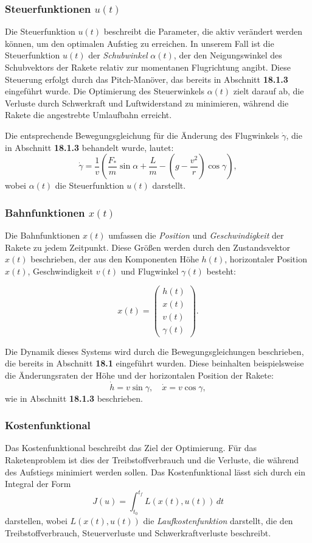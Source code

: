 \subsubsection{Steuerfunktionen \( u(t) \)}
Die Steuerfunktion \( u(t) \) beschreibt die Parameter, die aktiv verändert werden können, um den optimalen Aufstieg zu erreichen. In unserem Fall ist die Steuerfunktion \( u(t) \) der \textit{Schubwinkel} \( \alpha(t) \), der den Neigungswinkel des Schubvektors der Rakete relativ zur momentanen Flugrichtung angibt. Diese Steuerung erfolgt durch das Pitch-Manöver, das bereits in Abschnitt \textbf{18.1.3} eingeführt wurde. Die Optimierung des Steuerwinkels \( \alpha(t) \) zielt darauf ab, die Verluste durch Schwerkraft und Luftwiderstand zu minimieren, während die Rakete die angestrebte Umlaufbahn erreicht.

Die entsprechende Bewegungsgleichung für die Änderung des Flugwinkels \( \dot{\gamma} \), die in Abschnitt \textbf{18.1.3} behandelt wurde, lautet:
\[
\dot{\gamma} = \frac{1}{v} \left( \frac{F_*}{m} \sin \alpha + \frac{L}{m} - \left( g - \frac{v^2}{r} \right) \cos \gamma \right),
\]
wobei \( \alpha(t) \) die Steuerfunktion \( u(t) \) darstellt.

\subsubsection{Bahnfunktionen \( x(t) \)}
Die Bahnfunktionen \( x(t) \) umfassen die \textit{Position} und \textit{Geschwindigkeit} der Rakete zu jedem Zeitpunkt. Diese Größen werden durch den Zustandsvektor \( x(t) \) beschrieben, der aus den Komponenten Höhe \( h(t) \), horizontaler Position \( x(t) \), Geschwindigkeit \( v(t) \) und Flugwinkel \( \gamma(t) \) besteht:

\[
x(t) = \begin{pmatrix} h(t) \\ x(t) \\ v(t) \\ \gamma(t) \end{pmatrix}.
\]

Die Dynamik dieses Systems wird durch die Bewegungsgleichungen beschrieben, die bereits in Abschnitt \textbf{18.1} eingeführt wurden. Diese beinhalten beispielsweise die Änderungsraten der Höhe und der horizontalen Position der Rakete:
\[
\dot{h} = v \sin \gamma, \quad \dot{x} = v \cos \gamma,
\]
wie in Abschnitt \textbf{18.1.3} beschrieben.

\subsubsection{Kostenfunktional}
Das Kostenfunktional beschreibt das Ziel der Optimierung. Für das Raketenproblem ist dies der Treibstoffverbrauch und die Verluste, die während des Aufstiegs minimiert werden sollen. Das Kostenfunktional lässt sich durch ein Integral der Form
\[
J(u) = \int_{t_0}^{t_f} L(x(t), u(t)) \, dt
\]
darstellen, wobei \( L(x(t), u(t)) \) die \textit{Laufkostenfunktion} darstellt, die den Treibstoffverbrauch, Steuerverluste und Schwerkraftverluste beschreibt.

